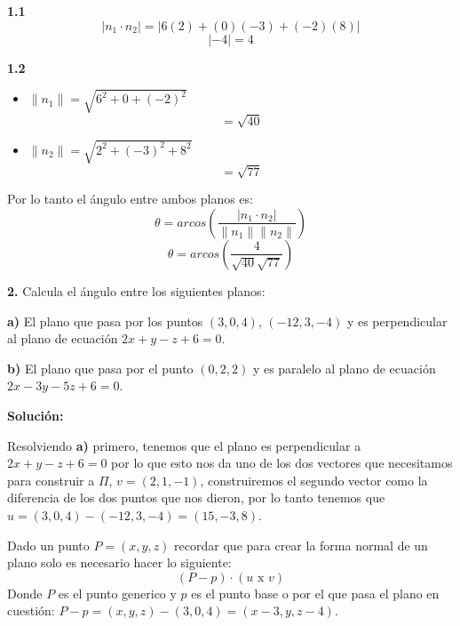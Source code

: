 \documentclass{article}
\begin{document}
\hspace*{-1cm}\begin{minipage}[c]{0.5cm}
    \textbf{1.1}
    $$\left| n_1 \cdot n_2\right| = \left|6(2)+(0)(-3)+(-2)(8)\right|$$
    $$\left|-4\right| = 4$$
\end{minipage}\hspace*{6cm}\begin{minipage}[c]{8cm}
    \textbf{1.2}
    \vspace{10pt}
    \begin{itemize}
        \item$\|n_1\| = \sqrt{6^2+0+(-2)^2}$
        $$=\sqrt{40}$$
        \item $\|n_2\| = \sqrt{2^2+(-3)^2+8^2}$
        $$= \sqrt{77}$$
    \end{itemize}
\end{minipage}

Por lo tanto el ángulo entre ambos planos es: 
$$\theta = arcos\left(\frac{\left|n_1\cdot n_2\right|}{\|n_1\|\|n_2\|}\right)$$
$$\theta = arcos\left(\frac{4}{\sqrt{40}\sqrt{77}}\right)$$
\vspace*{10pt}

\textbf{2.} Calcula el ángulo entre los siguientes planos:
\vspace*{10pt}

\begin{center}
    \begin{minipage}[c]{12cm}
        \textbf{a)} El plano que pasa por los puntos $(3, 0, 4)$, $(-12, 3, -4)$ y es 
        perpendicular al plano de ecuación $2x + y - z + 6 = 0$.
        \vspace{10pt}
        
        \textbf{b)} El plano que pasa por el punto $(0,2,2)$ y es paralelo al plano de ecuación
        $2x - 3y - 5z + 6 = 0$.
    \end{minipage}
\end{center}
\vspace{10pt}

\textbf{Solución:}
\vspace{10pt}

Resolviendo \textbf{a)} primero, tenemos que el plano es perpendicular a $2x + y - z + 6 = 0$ por lo que esto nos da uno de los dos 
vectores que necesitamos para construir a $\Pi$, $v =(2,1,-1)$, construiremos el segundo vector como la diferencia de los dos puntos que nos dieron, 
por lo tanto tenemos que $u =(3,0,4) -(-12,3,-4) =(15,-3, 8)$. 

Dado un punto $P =(x,y,z)$ recordar que para crear la forma normal de un plano solo es necesario hacer lo siguiente: 
$$(P-p)\cdot(u \text{ x } v)$$
Donde $P$ es el punto generico y $p$ es el punto base o por el que pasa el plano en cuestión: $P-p =(x,y,z)-(3,0,4) = (x-3,y,z-4)$.
\end{document}
